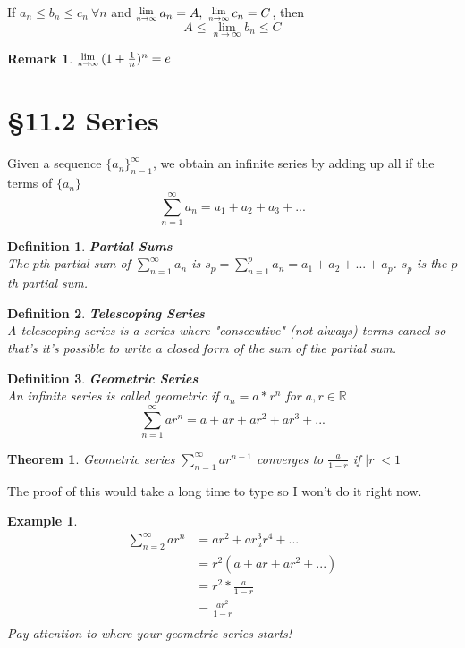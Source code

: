 \documentclass[12 pt]{article}
\newcommand{\Lim}[1]{\raisebox{0.5ex}{\scalebox{0.8}{$\displaystyle \lim_{#1}\;$}}}
\newcommand{\sumo}{\sum\limits_{n=1}^{\infty}}
\newcommand{\R}{\mathbb{R}}
\newcommand{\toinfty}{\rightarrow\infty}
\newtheorem*{exmp*}{Example}
\newtheorem*{def*}{Definition}
\newtheorem*{thrm}{Theorem}
\newtheorem*{remark}{Remark}
\begin{document}
		If $a_n\leq b_n\leq c_n\ \forall n$ and $\Lim{n\toinfty}a_n=A,\ \Lim{n\toinfty}c_n=C$, then
		$$A\leq\lim_{n\toinfty}b_n\leq C$$
		\begin{remark}
			$\Lim{n\toinfty}(1+\frac{1}{n})^n=e$
		\end{remark}
	\section{\S 11.2 Series}
		Given a sequence $\{a_n\}_{n=1}^{\infty}$, we obtain an infinite series
		by adding up all if the terms of $\{a_n\}$
		$$\sumo a_n=a_1+a_2+a_3+...$$
		\begin{def*}\textbf{Partial Sums}\\
			The $p$th partial sum of $\sumo a_n$ is $s_p=\sum_{n=1}^p a_n=a_1+a_2+...+a_p$. $s_p$ is the $p$th partial sum.
		\end{def*}
		\begin{def*}\textbf{Telescoping Series}\\
			A telescoping series is a series where "consecutive" (not always) terms cancel so that's it's possible to write a closed form of the sum of the partial sum.
		\end{def*}
		\begin{def*}\textbf{Geometric Series}\\
			An infinite series is called geometric if $a_n=a*r^n$ for $a,r\in\R$
			$$\sumo ar^n=a+ar+ar^2+ar^3+...$$
		\end{def*}
		\begin{thrm}
			Geometric series $\sumo ar^{n-1}$ converges to $\frac{a}{1-r}$ if
			$\left|r\right|<1$
		\end{thrm}
		The proof of this would take a long time to type so I won't do it right now.
		\begin{exmp*}
			\begin{align*}
				\sum_{n=2}^{\infty}ar^n&=ar^2+ar^3_ar^4+...\\
				&=r^2(a+ar+ar^2+...)\\
				&=r^2*\frac{a}{1-r}\\
				&=\frac{ar^2}{1-r}\\
			\end{align*}
			Pay attention to where your geometric series starts!
		\end{exmp*}
\end{document}
